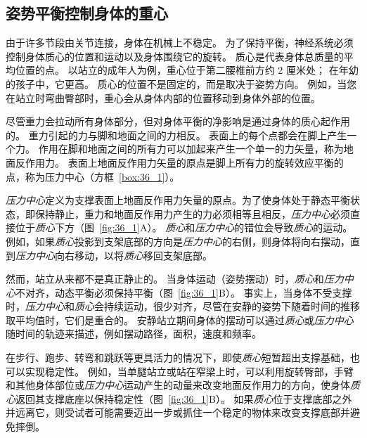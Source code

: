 \subsection{姿势平衡控制身体的重心}

由于许多节段由关节连接，身体在机械上不稳定。
为了保持平衡，神经系统必须控制身体质心的位置和运动以及身体围绕它的旋转。
质心是代表身体总质量的平均位置的点。
以站立的成年人为例，重心位于第二腰椎前方约 2 厘米处；
在年幼的孩子中，它更高。
质心的位置不是固定的，而是取决于姿势方向。
例如，当您在站立时弯曲臀部时，重心会从身体内部的位置移动到身体外部的位置。


尽管重力会拉动所有身体部分，但对身体平衡的净影响是通过身体的质心起作用的。
重力引起的力与脚和地面之间的力相反。
表面上的每个点都会在脚上产生一个力。
作用在脚和地面之间的所有力可以加起来产生一个单一的力矢量，称为地面反作用力。
表面上地面反作用力矢量的原点是脚上所有力的旋转效应平衡的点，称为压力中心（方框~\ref{box:36_1}）。



\begin{proposition}[神经解剖学导航术语] \label{box:36_1}
	
	\quad \quad \textit{压力中心}定义为支撑表面上地面反作用力矢量的原点。为了使身体处于静态平衡状态，即保持静止，重力和地面反作用力产生的力必须相等且相反，\textit{压力中心}必须直接位于\textit{质心}下方（图~\ref{fig:36_1}A）。
	\textit{质心}和\textit{压力中心}的错位会导致\textit{质心}的运动。
	例如，如果\textit{质心}投影到支架底部的方向是\textit{压力中心}的右侧，则身体将向右摆动，直到\textit{压力中心}向右移动，以将\textit{质心}移回支架底部。
	
	\quad \quad 然而，站立从来都不是真正静止的。
	当身体运动（姿势摆动）时，\textit{质心}和\textit{压力中心}不对齐，动态平衡必须保持平衡（图~\ref{fig:36_1}B）。
	事实上，当身体不受支撑时，\textit{压力中心}和\textit{质心}会持续运动，很少对齐，尽管在安静的姿势下随着时间的推移取平均值时，它们是重合的。
	安静站立期间身体的摆动可以通过\textit{质心}或\textit{压力中心}随时间的轨迹来描述，例如摆动路径，面积，速度和频率。
	
	\quad \quad 在步行、跑步、转弯和跳跃等更具活力的情况下，即使\textit{质心}短暂超出支撑基础，也可以实现稳定性。
	例如，当单腿站立或站在窄梁上时，可以利用旋转臀部，手臂和其他身体部位或\textit{压力中心}运动产生的动量来改变地面反作用力的方向，使身体\textit{质心}返回其支撑底座以保持稳定性（图~\ref{fig:36_1}B）。
	如果\textit{质心}位于支撑底部之外并远离它，则受试者可能需要迈出一步或抓住一个稳定的物体来改变支撑底部并避免摔倒。
	
\end{proposition}


